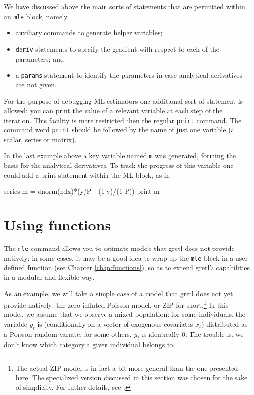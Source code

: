 We have discussed above the main sorts of statements that are
permitted within an \texttt{mle} block, namely 
%
\begin{itemize}
\item auxiliary commands to generate helper variables;
\item \texttt{deriv} statements to specify the gradient with respect
  to each of the parameters; and
\item a \texttt{params} statement to identify the parameters in case
  analytical derivatives are not given.
\end{itemize}

For the purpose of debugging ML estimators one additional sort of
statement is allowed: you can print the value of a relevant variable
at each step of the iteration.  This facility is more restricted then
the regular \texttt{print} command.  The command word \texttt{print}
should be followed by the name of just one variable (a scalar, series
or matrix).

In the last example above a key variable named \texttt{m} was
generated, forming the basis for the analytical derivatives.  To track
the progress of this variable one could add a print statement within
the ML block, as in
%
\begin{code}
series m = dnorm(ndx)*(y/P - (1-y)/(1-P))
print m
\end{code}

\section{Using functions}
\label{sec:mle-func}

The \texttt{mle} command allows you to estimate models that
gretl does not provide natively: in some cases, it may be a good
idea to wrap up the \texttt{mle} block in a user-defined function (see
Chapter \ref{chap:functions}), so as to extend gretl's
capabilities in a modular and flexible way.

As an example, we will take a simple case of a model that gretl
does not yet provide natively: the zero-inflated Poisson model, or ZIP
for short.\footnote{The actual ZIP model is in fact a bit more general
than the one presented here. The specialized version discussed in this
section was chosen for the sake of simplicity. For futher details, see
\cite{greene03}.} In this model, we assume that we observe a mixed
population: for some individuals, the variable $y_t$ is (conditionally
on a vector of exogenous covariates $x_t$) distributed as a Poisson
random variate; for some others, $y_t$ is identically 0. The trouble
is, we don't know which category a given individual belongs to.  


